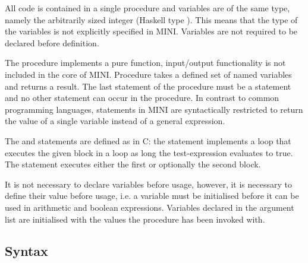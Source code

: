 \documentclass{article}
\begin{document}
All code is contained in a single procedure  and variables are of the same type, namely the arbitrarily sized integer (Haskell type ). This means that the type of the variables is not explicitly specified in MINI. Variables are not required to be declared before definition.

The procedure  implements a pure function, input/output functionality is not included in the core of MINI. Procedure  takes a defined set of named variables and returns a result. The last statement of the procedure must be a  statement and no other  statement can occur in the procedure. In contrast to common programming languages,  statements in MINI are syntactically restricted to return the value of a single variable instead of a general expression.

The  and  statements are defined as in C: the  statement implements a loop that executes the given block in a loop as long the test-expression evaluates to true. The  statement executes either the first or optionally the second block.

It is not necessary to declare variables before usage, however, it is necessary to define their value before usage, i.e. a variable must be initialised before it can be used in arithmetic and boolean expressions.
Variables declared in the argument list are initialised with the values the procedure has been invoked with.


\subsection{Syntax}
\end{document}
